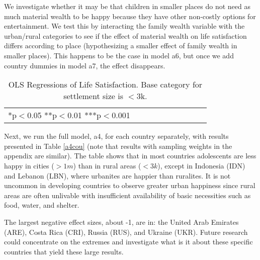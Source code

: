\documentclass[10pt, letterpaper]{article}
\begin{document}
\begin{spacing}{1.4}
We investigate whether it may be that children in smaller places do not need as
much material wealth to be happy because they have other non-costly options for
entertainment. We test this by interacting the family wealth variable with the
urban/rural categories to see if the effect of material wealth on life
satisfaction differs according to place (hypothesizing a smaller effect of
family wealth in smaller places).
This happens to be the case in model a6, but once we add country dummies in
model a7, the effect disappears. 

\begin{table}[H]\centering\caption{OLS Regressions of Life Satisfaction. Base category for settlement size is $<$3k.} \label{regA} \begin{scriptsize} \begin{tabular}{p{1.6in}p{.5in}p{.5in}p{.5in}p{.5in}|p{.5in}p{.5in}|p{.5in}|p{.5in}p{.5in}p{.5 in}p{.5in}p{.5 in}}\hline  \hline\multicolumn{4}{l}{*p$<$0.05 **p$<$0.01 ***p$<$0.001} \end{tabular}\end{scriptsize}\end{table}



Next, we run the full model, a4, for each country separately, with results
presented in Table \ref{a4cou} (note that results with sampling weights in the appendix
are similar). The table shows that in most countries adolescents are less happy
in cities ($>1m$) than in rural areas ($<3k$), except in Indonesia (IDN) and
Lebanon (LBN), where urbanites are happier than ruralites. {It is not uncommon in developing countries to observe greater
urban happiness since rural areas are often unlivable with insufficient availability of basic necessities such as food, water, and shelter.}%
 
The largest negative effect sizes, about -1, are in: the United Arab Emirates (ARE), Costa Rica (CRI), Russia (RUS), and Ukraine (UKR). 
Future research could concentrate on the extremes and investigate what is it
about these specific countries that yield these large results. 


\end{spacing}
\end{document}
